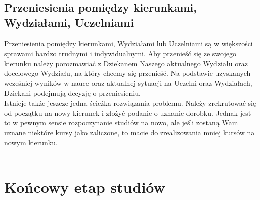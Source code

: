 \documentclass[11pt]{article}
\begin{document}
\subsection{Przeniesienia pomiędzy kierunkami, Wydziałami, Uczelniami} 
\indent \hspace{0.5cm} Przeniesienia pomiędzy kierunkami, Wydziałami lub Uczelniami są w większości sprawami bardzo trudnymi i indywidualnymi. Aby przenieść się ze swojego kierunku należy porozmawiać z Dziekanem Naszego aktualnego Wydziału oraz docelowego Wydziału, na który chcemy się przenieść. Na podstawie uzyskanych wcześniej wyników w nauce oraz aktualnej sytuacji na Uczelni oraz Wydziałach, Dziekani podejmują decyzję o przeniesieniu. \\
\indent Istnieje także jeszcze jedna ścieżka rozwiązania problemu. Należy zrekrutować się od początku na nowy kierunek i złożyć podanie o uznanie dorobku. Jednak jest to w pewnym sensie rozpoczynanie studiów na nowo, ale jeśli zostaną Wam uznane niektóre kursy jako zaliczone, to macie do zrealizowania mniej kursów na nowym kierunku. \\\\

\newpage
\section{Końcowy etap studiów}
\end{document}
